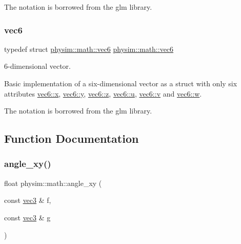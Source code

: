 The notation is borrowed from the \textquotesingle{}glm\textquotesingle{} library. \mbox{\label{namespacephysim_1_1math_a4927e09ba2ee25602c7ca62839a24d53}} 
\subsubsection{\texorpdfstring{vec6}{vec6}}
{\footnotesize\ttfamily typedef struct \hyperlink{structphysim_1_1math_1_1vec6}{physim\+::math\+::vec6}  \hyperlink{structphysim_1_1math_1_1vec6}{physim\+::math\+::vec6}}



6-\/dimensional vector. 

Basic implementation of a six-\/dimensional vector as a struct with only six attributes \hyperlink{structphysim_1_1math_1_1vec6_a38324c181585016fc93ec6d64532d649}{vec6\+::x}, \hyperlink{structphysim_1_1math_1_1vec6_a1f17bfbd699b91f52527d61302bd97d8}{vec6\+::y}, \hyperlink{structphysim_1_1math_1_1vec6_a97d6e428b29374a491d63c0470e6c1e9}{vec6\+::z}, \hyperlink{structphysim_1_1math_1_1vec6_a20a084c3874c741f3c8f90b184b563bc}{vec6\+::u}, \hyperlink{structphysim_1_1math_1_1vec6_ade41c2d920828684bfcfa76563bb65d5}{vec6\+::v} and \hyperlink{structphysim_1_1math_1_1vec6_ac35ab7be6a7783abff02bf48968dec6a}{vec6\+::w}.

The notation is borrowed from the \textquotesingle{}glm\textquotesingle{} library. 

\subsection{Function Documentation}
\mbox{\label{namespacephysim_1_1math_ac80bfe5ed2d96ff378869b6c087bc7df}} 
\subsubsection{\texorpdfstring{angle\+\_\+xy()}{angle\_xy()}}
{\footnotesize\ttfamily float physim\+::math\+::angle\+\_\+xy (\begin{DoxyParamCaption}\item[{const \hyperlink{structphysim_1_1math_1_1vec3}{vec3} \&}]{f,  }\item[{const \hyperlink{structphysim_1_1math_1_1vec3}{vec3} \&}]{g }\end{DoxyParamCaption})\hspace{0.3cm}{\ttfamily [inline]}}



